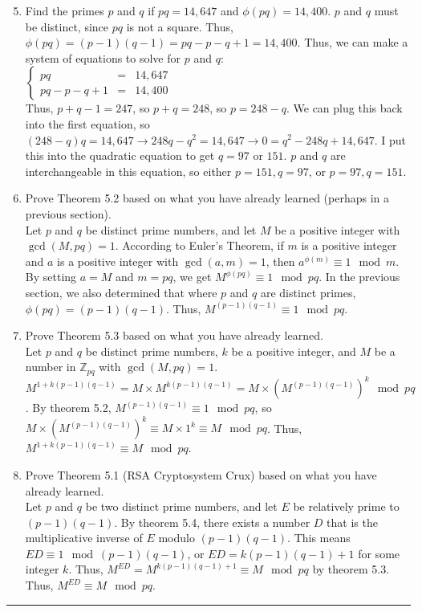 \documentclass{article}
\begin{document}
\begin{enumerate}
    \setcounter{enumi}{4}
    \item Find the primes $p$ and $q$ if $pq = 14,647$ and $\phi(pq) = 14,400$.
          $p$ and $q$ must be distinct, since $pq$ is not a square. Thus, $\phi(pq) = (p-1)(q-1) = pq - p - q + 1 = 14,400$. Thus, we can make a system of equations to solve for $p$ and $q$:\\
          $\left\{
              \begin{array}{lcr}
                  pq             & = & 14,647 \\
                  pq - p - q + 1 & = & 14,400
              \end{array}
              \right.$\\
          Thus, $p + q - 1 = 247$, so $p + q = 248$, so $ p = 248 - q$. We can plug this back into the first equation, so $(248-q)q = 14,647 \to 248q - q^{2} = 14,647 \to 0 = q^{2} - 248q + 14,647$. I put this into the quadratic equation to get $q = 97 \text{ or } 151$. $p$ and $q$ are interchangeable in this equation, so either $p = 151, q = 97$, or $p = 97, q = 151$.
    \item Prove Theorem 5.2 based on what you have already learned (perhaps in a previous section).\\
          Let $p$ and $q$ be distinct prime numbers, and let $M$ be a positive integer with $\gcd(M, pq) = 1$. According to Euler's Theorem, if $m$ is a positive integer and $a$ is a positive integer with $\gcd(a, m) = 1$, then $a^{\phi(m)} \equiv 1 \mod{m}$. By setting $a = M$ and $m = pq$, we get $M^{\phi(pq)} \equiv 1 \mod{pq}$. In the previous section, we also determined that where $p$ and $q$ are distinct primes, $\phi(pq) = (p-1)(q-1)$. Thus, $M^{(p-1)(q-1)} \equiv 1 \mod{pq}$.
    \item Prove Theorem 5.3 based on what you have already learned.\\
          Let $p$ and $q$ be distinct prime numbers, $k$ be a positive integer, and $M$ be a number in $\mathbb{Z}_{pq}$ with $\gcd(M, pq) = 1$. $M^{1+k(p-1)(q-1)} = M \times M^{k(p-1)(q-1)} = M \times (M^{(p-1)(q-1)})^{k} \mod{pq}$. By theorem 5.2, $M^{(p-1)(q-1)} \equiv 1 \mod{pq}$, so $M \times (M^{(p-1)(q-1)})^{k} \equiv M \times 1^{k} \equiv M \mod{pq}$. Thus, $M^{1+k(p-1)(q-1)} \equiv M \mod{pq}$.
    \item Prove Theorem 5.1 (RSA Cryptosystem Crux) based on what you have already learned.\\
          Let $p$ and $q$ be two distinct prime numbers, and let $E$ be relatively prime to $(p-1)(q-1)$. By theorem 5.4, there exists a number $D$ that is the multiplicative inverse of $E$ modulo $(p-1)(q-1)$. This means $ED \equiv 1 \mod{(p-1)(q-1)}$, or $ED = k(p-1)(q-1) + 1$ for some integer $k$. Thus, $M^{ED} = M^{k(p-1)(q-1) + 1} \equiv M \mod{pq}$ by theorem 5.3. Thus, $M^{ED} \equiv M \mod{pq}$.
\end{enumerate}\hrule \vspace{8pt}   
\end{document}
